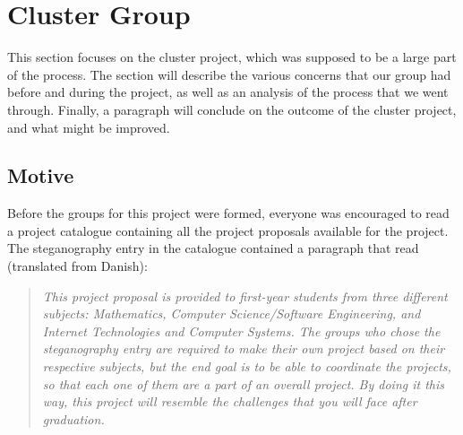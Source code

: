 \section{Cluster Group}
This section focuses on the cluster project, which was supposed to be a large part of the process. The section will describe the various concerns that our group had before and during the project, as well as an analysis of the process that we went through. Finally, a paragraph will conclude on the outcome of the cluster project, and what might be improved.

\subsection*{Motive}
Before the groups for this project were formed, everyone was encouraged to read a project catalogue containing all the project proposals available for the project.
The steganography entry in the catalogue contained a paragraph that read (translated from Danish):
\begin{quote}\textit{This project proposal is provided to first-year students from three different subjects: Mathematics, Computer Science/Software Engineering, and Internet Technologies and Computer Systems. The groups who chose the steganography entry are required to make their own project based on their respective subjects, but the end goal is to be able to coordinate the projects, so that each one of them are a part of an overall project. By doing it this way, this project will resemble the challenges that you will face after graduation.}\end{quote}


